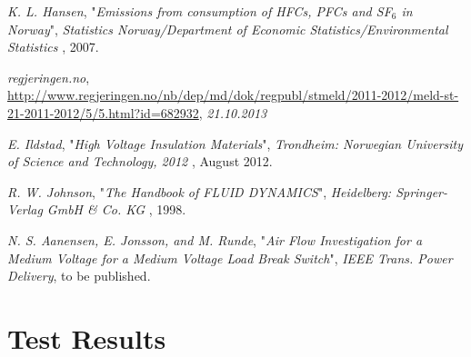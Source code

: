 \documentclass[10pt,a4paper]{article} %
\begin{document}
\begin{thebibliography}{10}
 \textit{K. L. Hansen}, "\textit{Emissions from consumption of HFCs, PFCs and SF$_6$ in Norway}", \textit{Statistics Norway/Department of Economic Statistics/Environmental Statistics
}, 2007.

 \textit{regjeringen.no}, \url{http://www.regjeringen.no/nb/dep/md/dok/regpubl/stmeld/2011-2012/meld-st-21-2011-2012/5/5.html?id=682932}, \textit{21.10.2013}



 \textit{E. Ildstad}, "\textit{High Voltage Insulation Materials}", \textit{Trondheim: Norwegian University of Science and Technology, 2012
}, August 2012.

 \textit{R. W. Johnson}, "\textit{The Handbook of FLUID DYNAMICS}", \textit{Heidelberg: Springer-Verlag GmbH \& Co. KG
}, 1998.

 \textit{N. S. Aanensen, E. Jonsson, and M. Runde}, "\textit{Air Flow Investigation for a Medium Voltage for a Medium Voltage Load Break Switch}", \textit{IEEE Trans. Power Delivery}, to be published.

\end{thebibliography}

\appendix
\section{Test Results}
\end{document}
